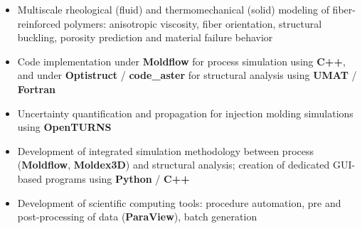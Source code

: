 \documentclass[10pt,a4paper]{altacv}
\begin{document}

\pagestyle{fancy}
\fancyheadoffset{8cm}
\fancyhf{}
\renewcommand{\headrulewidth}{0pt}

\begin{fullwidth}
\makecvheader
\end{fullwidth}



\begin{itemize}
\item Multiscale rheological (fluid) and thermomechanical (solid) modeling of fiber-reinforced polymers: anisotropic viscosity, fiber orientation, structural buckling, porosity prediction and material failure behavior
\item Code implementation under \textbf{Moldflow} for process simulation using \textbf{C++}, and under \textbf{Optistruct} / \textbf{code\_aster} for structural analysis using \textbf{UMAT} / \textbf{Fortran}
\item Uncertainty quantification and propagation for injection molding simulations using \textbf{OpenTURNS}
\item Development of integrated simulation methodology between process (\textbf{Moldflow}, \textbf{Moldex3D}) and structural analysis; creation of dedicated GUI-based programs using \textbf{Python} / \textbf{C++}
\item Development of scientific computing tools: procedure automation, pre and post-processing of data (\textbf{ParaView}), batch generation
\end{itemize}
\end{document}
